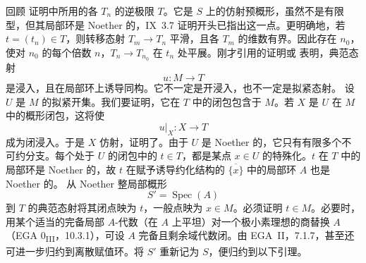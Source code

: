 回顾  证明中所用的各 \(T_n\) 的逆极限 \(T\)。它是 \(S\) 上的仿射预概形，虽然不是有限型，但其局部环是 Noether 的，IX~3.7 证明开头已指出这一点。更明确地，若 \(t=(t_n)\in T\)，则转移态射 \(T_m\to T_n\) 平滑，且各 \(T_m\) 的维数有界。因此存在 \(n_0\)，使对 \(n_0\) 的每个倍数 \(n\)，\(T_n\to T_{n_0}\) 在 \(t_n\) 处平展。刚才引用的证明或  表明，典范态射
\[
  u:M\longrightarrow T
\]
是浸入，且在局部环上诱导同构。它不一定是开浸入，也不一定是拟紧态射。
设 \(U\) 是 \(M\) 的拟紧开集。我们要证明，它在 \(T\) 中的闭包包含于 \(M\)。若 \(X\) 是 \(U\) 在 \(M\) 中的概形闭包，这将使
\[
  u|_X:X\longrightarrow T
\]
成为闭浸入。于是 \(X\) 仿射，证明了\textup{}。由于 \(U\) 是 Noether 的，它只有有限多个不可约分支。每个处于 \(U\) 的闭包中的 \(t\in T\)，都是某点 \(x\in U\) 的特殊化。\(t\) 在 \(T\) 中的局部环是 Noether 的，故 \(t\) 在赋予诱导约化结构的 \(\overline{\{x\}}\) 中的局部环 \(A\) 也是 Noether 的。
从 Noether 整局部概形
\[
  S'=\operatorname{Spec}(A)
\]
到 \(T\) 的典范态射将其闭点映为 \(t\)，一般点映为 \(x\in M\)。必须证明 \(t\in M\)。必要时，用某个适当的完备局部 \(A\)-代数（在 \(A\) 上平坦）对一个极小素理想的商替换 \(A\)\textup{（EGA 0\textsubscript{III}，10.3.1）}，可设 \(A\) 完备且剩余域代数闭。由 EGA~II，7.1.7，甚至还可进一步归约到离散赋值环。将 \(S'\) 重新记为 \(S\)，便归约到以下引理。
